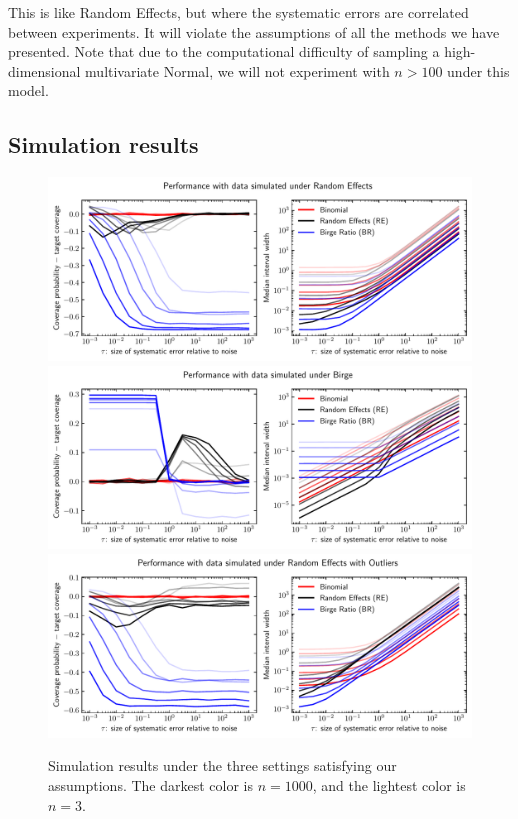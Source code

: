\documentclass[letterpaper,12pt]{article}
\begin{document}
This is like Random Effects, but where the systematic errors are correlated between experiments. It will violate the assumptions of all the methods we have presented. Note that due to the computational difficulty of sampling a high-dimensional multivariate Normal, we will not experiment with $n>100$ under this model.

\subsection{Simulation results}\label{simulation-results}

\begin{figure}[htbp]
\centering
\includegraphics[width=\textwidth]{figs/performance_random_effects.pdf}
\includegraphics[width=\textwidth]{figs/performance_birge.pdf}
\includegraphics[width=\textwidth]{figs/performance_random_effects_outliers.pdf}
\label{fig:sim-results}
\caption{Simulation results under the three settings satisfying our assumptions. The darkest color is $n=1000$, and the lightest color is $n=3$.}
\end{figure}
\end{document}

